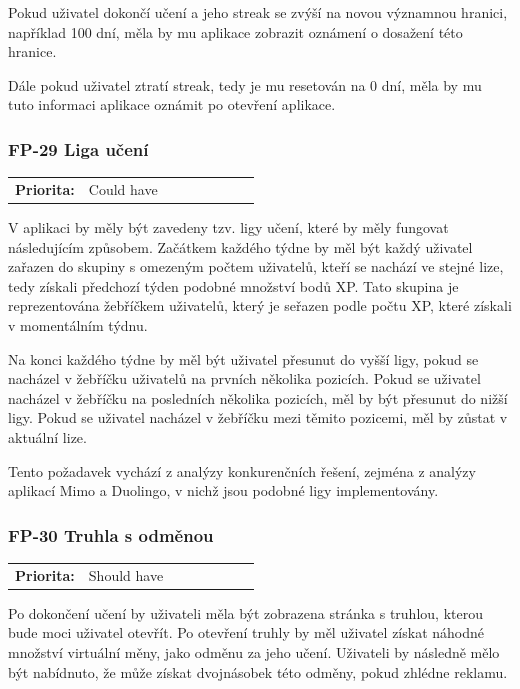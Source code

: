 Pokud uživatel dokončí učení a jeho streak se zvýší na novou významnou hranici, například 100 dní, měla by mu aplikace zobrazit oznámení o dosažení této hranice.

Dále pokud uživatel ztratí streak, tedy je mu resetován na 0 dní, měla by mu tuto informaci aplikace oznámit po otevření aplikace. %

\subsubsection{FP-29 Liga učení}

\begin{tabular}{lp{0.7\linewidth}}
    \textbf{Priorita:} & Could have \\
\end{tabular}

V aplikaci by měly být zavedeny tzv. ligy učení, které by měly fungovat následujícím způsobem. Začátkem každého týdne by měl být každý uživatel zařazen do skupiny s omezeným počtem uživatelů, kteří se nachází ve stejné lize, tedy získali předchozí týden podobné množství bodů XP. Tato skupina je reprezentována žebříčkem uživatelů, který je seřazen podle počtu XP, které získali v momentálním týdnu.

Na konci každého týdne by měl být uživatel přesunut do vyšší ligy, pokud se nacházel v žebříčku uživatelů na prvních několika pozicích. Pokud se uživatel nacházel v žebříčku na posledních několika pozicích, měl by být přesunut do nižší ligy. Pokud se uživatel nacházel v žebříčku mezi těmito pozicemi, měl by zůstat v aktuální lize.

Tento požadavek vychází z analýzy konkurenčních řešení, zejména z analýzy aplikací Mimo a Duolingo, v nichž jsou podobné ligy implementovány.

\subsubsection{FP-30 Truhla s odměnou}

\begin{tabular}{lp{0.7\linewidth}}
    \textbf{Priorita:} & Should have \\
\end{tabular}

Po dokončení učení by uživateli měla být zobrazena stránka s truhlou, kterou bude moci uživatel otevřít. Po otevření truhly by měl uživatel získat náhodné množství virtuální měny, jako odměnu za jeho učení. Uživateli by následně mělo být nabídnuto, že může získat dvojnásobek této odměny, pokud zhlédne reklamu.

